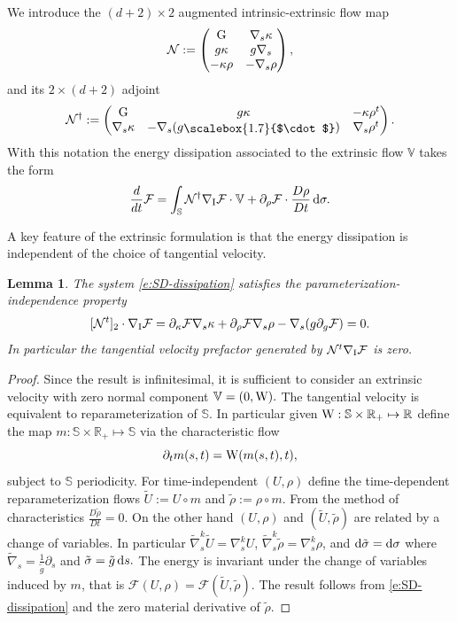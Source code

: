\documentclass[11pt]{amsart}
\theoremstyle{plain}
\newcommand{\beq}{\begin{equation}}
\newcommand{\eeq}{\end{equation}}
\newcommand\smbull{%
    \raisebox{-0.25ex}{\scalebox{1.7}{$\cdot$}}%
}
\def\cF{{\mathcal F}}
\def\cN{{\mathcal N}}
\def\mbbR{\mathbb{R}}
\def\mbbS{\mathbb{S}}
\def\mbbV{\mathbb{V}}
\def\mrG{\textrm G}
\def\mrI{\textrm I}
\def\mrW{\textrm W}
\def\mrd{\textrm d}
\def\cF{{\mathcal F}}
\def\bpm{\begin{pmatrix}}
\def\epm{\end{pmatrix}}
\def\rmd{\mathrm d}
\numberwithin{equation}{section}
\theoremstyle{plain}
\newtheorem{lemma}[thm]{Lemma}
\begin{document}
We introduce the $(d+2)\times 2$ augmented intrinsic-extrinsic flow map
 \beq \label{e:cN-def} \cN:= \bpm \mrG  &\nabla_s \kappa \cr
  g\kappa & g\nabla_s \cr
  -\kappa \rho & - \nabla_s \rho\epm,
  \eeq
  and its $2\times(d+2)$ adjoint
  \beq\label{e:cNt-def} \cN^\dag := \bpm  \mrG & g\kappa & -\kappa \rho^t \cr
  \nabla_s \kappa &-\nabla_s(g\smbull) & \nabla_s \rho^t \epm.
  \eeq
  With this notation  the energy dissipation associated to the extrinsic flow $\mbbV$ takes the form
  \beq
  \label{e:SD-dissipation}
  \frac{d}{dt} \cF =\int_\mbbS \cN^\dag \nabla_\mrI \cF
  \cdot \mbbV + \partial_\rho \cF\cdot \frac{D\rho}{Dt}\,\rmd \sigma.
  \eeq

A key feature of the extrinsic formulation is that the energy dissipation is independent of the choice of tangential velocity.
 \begin{lemma}
 \label{l:PIP}
The system \eqref{e:SD-dissipation} satisfies the parameterization-independence property
\beq\label{e:PIP}
[\cN^t]_2\cdot \nabla_{\mrI}\cF =
 \partial_\kappa\cF\nabla_s \kappa+
 \partial_\rho\cF\nabla_s \rho
 -\nabla_s(g\partial_g\cF)=0.
 \eeq
 In particular the tangential velocity prefactor generated by  $\cN^t \nabla_\mrI \cF $ is zero.
 \end{lemma}
\begin{proof}
Since the result is infinitesimal, it is sufficient to consider an extrinsic velocity with zero normal component $\mbbV=(0,\mrW).$
The tangential velocity is equivalent to reparameterization of $\mbbS.$ In particular given $\mrW:\mbbS\times\mbbR_+\mapsto\mbbR$ define the map $m:\mbbS\times\mbbR_+\mapsto \mbbS$ via the characteristic flow
\beq\label{e:MoC}
\partial_t m(s,t)=\mrW(m(s,t),t),
\eeq
subject to $\mbbS$ periodicity. For time-independent $(U,\rho)$ define the time-dependent reparameterization flows $\tilde U:=U\circ m$ and $\tilde \rho:=\rho\circ m.$
From the method of characteristics $\frac{D\tilde\rho}{Dt}=0$. On the other hand $(U,\rho)$ and $(\tilde U,\tilde \rho)$ are related by a change of variables. In particular $\tilde\nabla_s^k \tilde U=\nabla_s^k U$, $\tilde\nabla_s^k \tilde\rho=\nabla_s^k\rho$, and $\mrd \tilde\sigma=\mrd \sigma$ where $\tilde\nabla_s=\frac{1}{\tilde g} \partial_s$ and $\tilde\sigma=\tilde g \,\mrd s.$ The energy is invariant under the change of variables induced by $m$, that is $\cF(U,\rho)=\cF(\tilde U,\tilde \rho).$ 
The result follows from \eqref{e:SD-dissipation} and the zero material derivative of $\tilde \rho.$ 
\end{proof}
\end{document}
